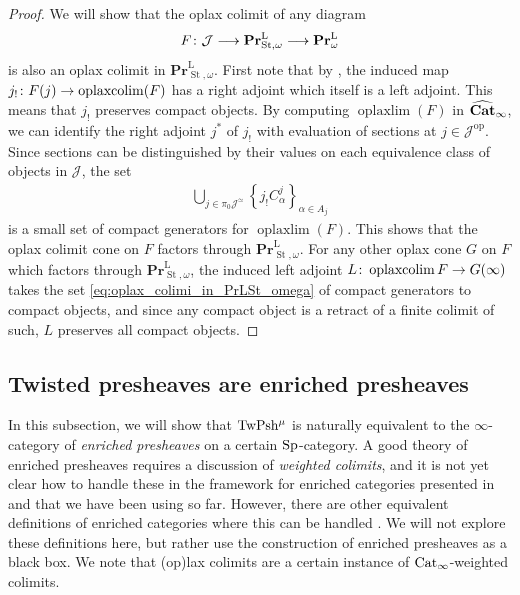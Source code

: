 \documentclass[10pt]{amsart}
\numberwithin{equation}{section}
\theoremstyle{definition}
\DeclareMathOperator{\op}{op}
\DeclareMathOperator{\St}{St}
\DeclareMathOperator*{\oplaxcolim}{oplaxcolim}
\DeclareMathOperator*{\oplaxlim}{oplaxlim}
\newcommand{\bfPr}{\mathbf{Pr}}
\newcommand{\rL}{\mathrm{L}}
\newcommand{\TwShv}{\mathrm{TwPsh}\vphantom{h}}
\newcommand{\Cat}{\mathrm{Cat}\vphantom{t}}
\newcommand{\bfCat}{\mathbf{Cat}\vphantom{t}}
\newcommand{\cJ}{\mathcal{J}}
\newcommand{\Sp}{\mathrm{Sp}\vphantom{p}}
\renewcommand{\to}{\mathchoice{\longrightarrow}{\rightarrow}{}{}}
\begin{document}
\begin{proof}
	We will show that the oplax colimit of any diagram
	\begin{align*}
		F\colon \cJ \to \bfPr^{\rL}_{\St,\omega} \to \bfPr^{\rL}_{\omega}
	\end{align*}
	is also an oplax colimit in $\bfPr^{\rL}_{\St,\omega}$.
  First note that by , the induced map $j_{!} \colon F(j) \to \oplaxcolim(F)$ has a right adjoint which itself is a left adjoint.
  This means that $j_{!}$ preserves compact objects.
  By computing $\oplaxlim(F)$ in $\widehat{\bfCat}_{\infty}$, we can identify the right adjoint $j^{*}$ of $j_{!}$ with evaluation of sections at $j\in \cJ^{\op}$.
  Since sections can be distinguished by their values on each equivalence class of objects in $\cJ$, the set
	\begin{align}\label{eq:oplax_colimi_in_PrLSt_omega}
		\bigcup_{j\in \pi_{0}\cJ^{\simeq}} \left\{j_{!} C^{j}_{\alpha}  \right\}_{\alpha \in A_{j}}
	\end{align}
	is a small set of compact generators for $\oplaxlim(F)$.
  This shows that the oplax colimit cone on $F$ factors through $\bfPr^{\rL}_{\St,\omega}$.
  For any other oplax cone $G$ on $F$ which factors through $\bfPr^{\rL}_{\St,\omega}$, the induced left adjoint $L\colon \oplaxcolim F \to G(\infty)$ takes the set \eqref{eq:oplax_colimi_in_PrLSt_omega} of compact generators to compact objects, and since any compact object is a retract of a finite colimit of such, $L$ preserves all compact objects.
\end{proof}





\subsection{Twisted presheaves are enriched presheaves}\label{subsec:twisted_presheaves_as_enriched_presheaves}

In this subsection, we will show that $\TwShv^{\mu}$ is naturally equivalent to the $\infty$-category of \emph{enriched presheaves} on a certain $\Sp$-category.
A good theory of enriched presheaves requires a discussion of \emph{weighted colimits}, and it is not yet clear how to handle these in the framework for enriched categories presented in \cite{GH} and that we have been using so far.
However, there are other equivalent definitions of enriched categories where this can be handled \cite{heine2025equivalence,heine2024higher,reutter2025enriched}.
We will not explore these definitions here, but rather use the construction of enriched presheaves as a black box.
We note that (op)lax colimits are a certain instance of $\Cat_{\infty}$-weighted colimits.
\end{document}
